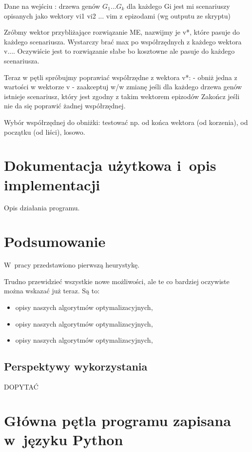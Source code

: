 \documentclass[licencjacka]{pracamgr}
\begin{document}
Dane na wejściu : 
drzewa genów $G_1$...$G_k$
dla każdego Gi jest mi scenariuszy opisanych jako wektory vi1 vi2 ... vim z epizodami (wg outputu ze skryptu)

Zróbmy wektor przybliżające rozwiązanie ME, nazwijmy je v*, które pasuje do każdego scenariusza. Wystarczy brać max po współrzędnych z każdego wektora v....
Oczywiście jest to rozwiązanie słabe bo kosztowne ale pasuje do każdego scenariusza.

Teraz w pętli spróbujmy poprawiać współrzędne z wektora v*:
- obniż jedna z wartości w wektorze v
- zaakceptuj w/w zmianę jeśli dla każdego drzewa genów istnieje scenariusz, który jest zgodny z takim wektorem epizodów
Zakończ jeśli nie da się poprawić żadnej współrzędnej.

Wybór współrzędnej do obniżki: testować np. od końca wektora (od korzenia), od początku (od liści), losowo.

\chapter{Dokumentacja użytkowa i~opis implementacji}\label{r:impl}

Opis działania programu.

\chapter{Podsumowanie}

W~pracy przedstawiono pierwszą heurystykę.

Trudno przewidzieć wszystkie nowe możliwości, ale te co bardziej
oczywiste można wskazać już teraz.  Są to:
\begin{itemize}
\item opisy naszych algorytmów optymalizacyjnych,
\item opisy naszych algorytmów optymalizacyjnych,
\item opisy naszych algorytmów optymalizacyjnych,
\end{itemize}

\section{Perspektywy wykorzystania}

DOPYTAĆ

\appendix

\chapter{Główna pętla programu zapisana w~języku Python}
\end{document}
